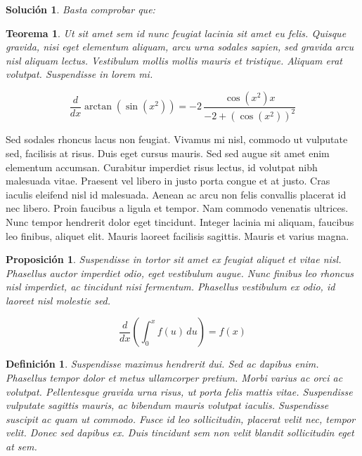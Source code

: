 \documentclass[10pt, a4paper]{article}
\makeatletter
\renewenvironment{proof}[1][\proofname] {\par\pushQED{\qed}\normalfont\topsep6\p@\@plus6\p@\relax\trivlist\item[\hskip\labelsep\itshape\sffamily#1\@addpunct{.}]\ignorespaces}{\popQED\endtrivlist\@endpefalse}
\theoremstyle{theorem-style}
\newtheorem{nth}{Teorema}[section]
\newtheorem{nprop}{Proposición}[section]
\theoremstyle{definition-style}
\newtheorem{ndef}{Definición}[section]
\theoremstyle{remark-style}
\theoremstyle{example-style}
\theoremstyle{definition-style}
\theoremstyle{remark-style}
\newtheorem*{sol}{Solución}
\makeatother
\begin{document}
\begin{sol}
  Basta comprobar que:
  
\end{sol}

\begin{nth}
  Ut sit amet sem id nunc feugiat lacinia sit amet eu felis. Quisque gravida, nisi eget elementum aliquam, arcu urna sodales sapien, sed gravida arcu nisl aliquam lectus. Vestibulum mollis mollis mauris et tristique. Aliquam erat volutpat. Suspendisse in lorem mi.

  $${\frac {d}{dx}}\arctan(\sin({x}^{2}))=-2\,{\frac {\cos({x}^{2})x}{-2+ \left (\cos({x}^{2})\right )^{2}}}$$
\end{nth}

\begin{proof}
  Sed sodales rhoncus lacus non feugiat. Vivamus mi nisl, commodo ut vulputate sed, facilisis at risus. Duis eget cursus mauris. Sed sed augue sit amet enim elementum accumsan. Curabitur imperdiet risus lectus, id volutpat nibh malesuada vitae. Praesent vel libero in justo porta congue et at justo. Cras iaculis eleifend nisl id malesuada. Aenean ac arcu non felis convallis placerat id nec libero. Proin faucibus a ligula et tempor. Nam commodo venenatis ultrices. Nunc tempor hendrerit dolor eget tincidunt. Integer lacinia mi aliquam, faucibus leo finibus, aliquet elit. Mauris laoreet facilisis sagittis. Mauris et varius magna.
\end{proof}

\begin{nprop}
  Suspendisse in tortor sit amet ex feugiat aliquet et vitae nisl. Phasellus auctor imperdiet odio, eget vestibulum augue. Nunc finibus leo rhoncus nisl imperdiet, ac tincidunt nisi fermentum. Phasellus vestibulum ex odio, id laoreet nisl molestie sed.

  $$\frac{d}{dx}\left( \int_{0}^{x} f(u)\,du\right)=f(x)$$
\end{nprop}

\begin{ndef}
  Suspendisse maximus hendrerit dui. Sed ac dapibus enim. Phasellus tempor dolor et metus ullamcorper pretium. Morbi varius ac orci ac volutpat. Pellentesque gravida urna risus, ut porta felis mattis vitae. Suspendisse vulputate sagittis mauris, ac bibendum mauris volutpat iaculis. Suspendisse suscipit ac quam ut commodo. Fusce id leo sollicitudin, placerat velit nec, tempor velit. Donec sed dapibus ex. Duis tincidunt sem non velit blandit sollicitudin eget at sem.
\end{ndef}
\end{document}

